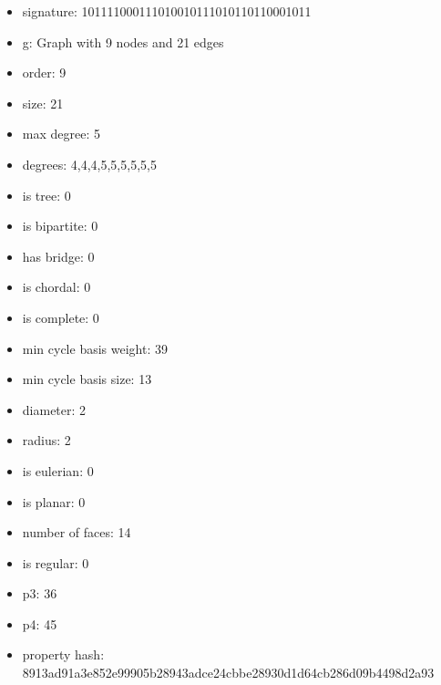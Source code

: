 \newpage
\begin{figure}
\end{figure}
\begin{itemize}
\item signature: 101111000111010010111010110110001011
\item g: Graph with 9 nodes and 21 edges
\item order: 9
\item size: 21
\item max degree: 5
\item degrees: 4,4,4,5,5,5,5,5,5
\item is tree: 0
\item is bipartite: 0
\item has bridge: 0
\item is chordal: 0
\item is complete: 0
\item min cycle basis weight: 39
\item min cycle basis size: 13
\item diameter: 2
\item radius: 2
\item is eulerian: 0
\item is planar: 0
\item number of faces: 14
\item is regular: 0
\item p3: 36
\item p4: 45
\item property hash: 8913ad91a3e852e99905b28943adce24cbbe28930d1d64cb286d09b4498d2a93
\end{itemize}
